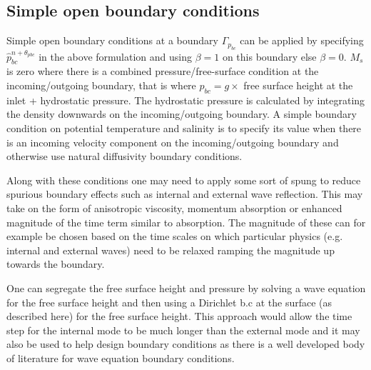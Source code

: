 \subsection{Simple open boundary conditions}
\noindent 
Simple open boundary conditions at a boundary $\Gamma_{p_{bc}}$ can be applied by specifying 
$\hat p_{bc}^{n+\theta_{pbc}}$ in the above formulation and using $\beta=1$ 
on this boundary else $\beta=0$. 
$M_s$ is zero where there is a combined pressure/free-surface condition at the 
incoming/outgoing boundary, that is where 
${\hat p}_{bc}=g \times$ free surface height at the inlet + hydrostatic pressure. 
The hydrostatic pressure is calculated by integrating the density 
downwards on the incoming/outgoing boundary. 
A simple boundary condition on potential temperature and salinity is  
to specify its value when there is an incoming velocity component 
on the incoming/outgoing boundary and otherwise use natural diffusivity 
boundary conditions. 

Along with these conditions one may need to apply some sort 
of spung to reduce spurious boundary effects such as 
internal and external wave reflection. This may take 
on the form of anisotropic viscosity, momentum absorption or enhanced magnitude 
of the time term similar to absorption. The magnitude of these 
can for example be chosen based on the time scales on which 
particular physics (e.g. internal and external waves) 
need to be relaxed ramping the magnitude up 
towards the boundary. 

One can segregate the free surface height and pressure by solving a wave equation for the free surface height and then 
using a Dirichlet b.c at the surface (as described here) for the free surface height. 
This approach would allow the time step for the internal mode to be much longer 
than the external mode and it may also be used to help design boundary conditions 
as there is a well developed body of literature for wave equation boundary 
conditions. 

